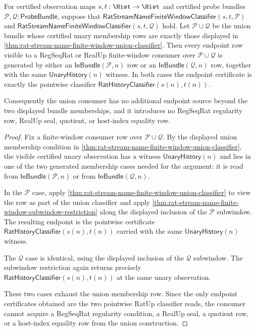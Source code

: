 \begin{theorem}
\label{thm:rat-stream-name-finite-window-union-endpoint-exhaustion}
For certified observation maps $s,t:\Hist\to\Hist$ and certified probe bundles
$\mathcal{P},\mathcal{Q}:\mathsf{ProbeBundle}$, suppose that
$\mathsf{RatStreamNameFiniteWindowClassifier}(s,t,\mathcal{P})$ and
$\mathsf{RatStreamNameFiniteWindowClassifier}(s,t,\mathcal{Q})$ hold. Let
$\mathcal{P}\cup\mathcal{Q}$ be the union bundle whose certified unary
membership rows are exactly those displayed in
\autoref{thm:rat-stream-name-finite-window-union-classifier}. Then every
endpoint row visible to a RegSeqRat or RealUp finite-window consumer over
$\mathcal{P}\cup\mathcal{Q}$ is generated by either an
$\mathsf{InBundle}(\mathcal{P},n)$ row or an
$\mathsf{InBundle}(\mathcal{Q},n)$ row, together with the same
$\mathsf{UnaryHistory}(n)$ witness. In both cases the endpoint certificate is
exactly the pointwise classifier
$\mathsf{RatHistoryClassifier}(s(n),t(n))$.

Consequently the union consumer has no additional endpoint source beyond the
two displayed bundle memberships, and it introduces no RegSeqRat regularity
row, RealUp seal, quotient, or host-index equality row.
\end{theorem}
\begin{proof}
Fix a finite-window consumer row over $\mathcal{P}\cup\mathcal{Q}$. By the
displayed union membership condition in
\autoref{thm:rat-stream-name-finite-window-union-classifier}, the visible
certified unary observation has a witness
$\mathsf{UnaryHistory}(n)$ and lies in one of the two generated membership
cases needed for the argument: it is read from
$\mathsf{InBundle}(\mathcal{P},n)$ or from
$\mathsf{InBundle}(\mathcal{Q},n)$.

In the $\mathcal{P}$ case, apply
\autoref{thm:rat-stream-name-finite-window-union-classifier} to view the row as
part of the union classifier and apply
\autoref{thm:rat-stream-name-finite-window-subwindow-restriction} along the
displayed inclusion of the $\mathcal{P}$ subwindow. The resulting endpoint is
the pointwise certificate
$\mathsf{RatHistoryClassifier}(s(n),t(n))$ carried with the same
$\mathsf{UnaryHistory}(n)$ witness.

The $\mathcal{Q}$ case is identical, using the displayed inclusion of the
$\mathcal{Q}$ subwindow. The subwindow restriction again returns precisely
$\mathsf{RatHistoryClassifier}(s(n),t(n))$ at the same unary observation.

These two cases exhaust the union membership row. Since the only endpoint
certificates obtained are the two pointwise RatUp classifier reads, the consumer
cannot acquire a RegSeqRat regularity condition, a RealUp seal, a quotient row,
or a host-index equality row from the union construction.
\end{proof}

